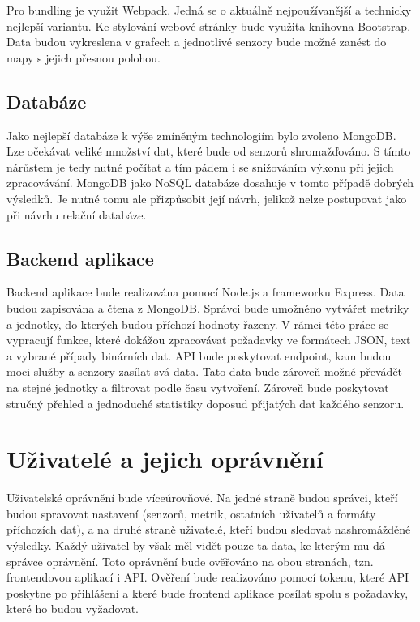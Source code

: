 \documentclass[thesis=M,czech]{FITthesis}[2018/10/20]
\begin{document}
	Pro bundling je využit Webpack. Jedná se o aktuálně nejpoužívanější a technicky nejlepší variantu. Ke stylování webové stránky bude využita knihovna Bootstrap. Data budou vykreslena v grafech a jednotlivé senzory bude možné zanést do mapy s jejich přesnou polohou.
\subsection{Databáze}
Jako nejlepší databáze k výše zmíněným technologiím bylo zvoleno MongoDB. Lze očekávat veliké množství dat, které bude od senzorů shromažďováno. S tímto nárůstem je tedy nutné počítat a tím pádem i se snižováním výkonu při jejich zpracovávání. MongoDB jako NoSQL databáze dosahuje v tomto případě dobrých výsledků. Je nutné tomu ale přizpůsobit její návrh, jelikož nelze postupovat jako při návrhu relační databáze. 
\subsection{Backend aplikace}
Backend aplikace bude realizována pomocí Node.js a frameworku Express. Data budou zapisována a čtena z MongoDB. Správci bude umožněno vytvářet metriky a jednotky, do kterých budou příchozí hodnoty řazeny. V rámci této práce se vypracují funkce, které dokážou zpracovávat požadavky ve formátech JSON, text a vybrané případy binárních dat. API bude poskytovat endpoint, kam budou moci služby a senzory zasílat svá data. Tato data bude zároveň možné převádět na stejné jednotky a filtrovat podle času vytvoření. Zároveň bude poskytovat stručný přehled a jednoduché statistiky doposud přijatých dat každého senzoru. 
	\section{Uživatelé a jejich oprávnění}
	Uživatelské oprávnění bude víceúrovňové. Na jedné straně budou správci, kteří budou spravovat nastavení (senzorů, metrik, ostatních uživatelů a formáty příchozích dat), a na druhé straně uživatelé, kteří budou sledovat nashromážděné výsledky. Každý uživatel by však měl vidět pouze ta data, ke kterým mu dá správce oprávnění. Toto oprávnění bude ověřováno na obou stranách, tzn. frontendovou aplikací i API. Ověření bude realizováno pomocí tokenu, které API poskytne po přihlášení a které bude frontend aplikace posílat spolu s požadavky, které ho budou vyžadovat.
	
\end{document}
